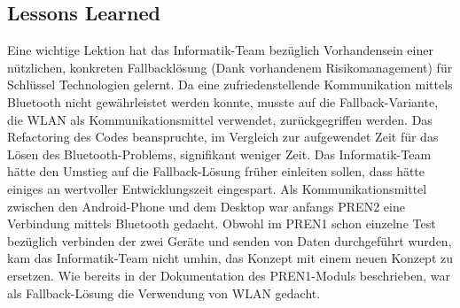 \subsection{Lessons Learned}
Eine wichtige Lektion hat das Informatik-Team bezüglich Vorhandensein einer nützlichen, 
konkreten Fallbacklösung (Dank vorhandenem Risikomanagement) für Schlüssel Technologien gelernt. 
Da eine zufriedenstellende Kommunikation mittels Bluetooth nicht gewährleistet werden konnte, 
musste auf die Fallback-Variante, die WLAN als Kommunikationsmittel verwendet, zurückgegriffen werden. 
Das Refactoring des Codes beanspruchte, im Vergleich zur aufgewendet Zeit für das Lösen des Bluetooth-Problems, 
signifikant weniger Zeit. Das Informatik-Team hätte den Umstieg auf die Fallback-Lösung früher einleiten sollen, 
dass hätte einiges an wertvoller Entwicklungszeit eingespart.
\newline
\newline
Als Kommunikationsmittel zwischen den Android-Phone und dem Desktop war anfangs PREN2 eine Verbindung 
mittels Bluetooth gedacht. Obwohl im PREN1 schon einzelne Test bezüglich verbinden der zwei Geräte und 
senden von Daten durchgeführt wurden, kam das Informatik-Team nicht umhin, das Konzept  mit einem neuen 
Konzept zu ersetzen. Wie bereits in der Dokumentation des PREN1-Moduls beschrieben, war als Fallback-Lösung 
die Verwendung von WLAN gedacht. 